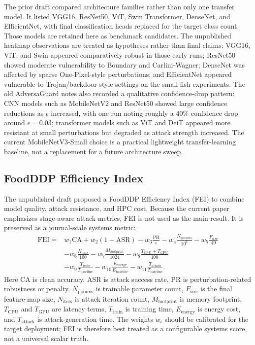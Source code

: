﻿\documentclass[6p,10pt,times]{ieeeaccess}
\begin{document}
The prior draft compared architecture families rather than only one transfer model. It listed VGG16, ResNet50, ViT, Swin Transformer, DenseNet, and EfficientNet, with final classification heads replaced for the target class count. Those models are retained here as benchmark candidates. The unpublished heatmap observations are treated as hypotheses rather than final claims: VGG16, ViT, and Swin appeared comparatively robust in those early runs; ResNet50 showed moderate vulnerability to Boundary and Carlini-Wagner; DenseNet was affected by sparse One-Pixel-style perturbations; and EfficientNet appeared vulnerable to Trojan/backdoor-style settings on the small fish experiments. The old AdversaGuard notes also recorded a qualitative confidence-drop pattern: CNN models such as MobileNetV2 and ResNet50 showed large confidence reductions as \(\epsilon\) increased, with one run noting roughly a 40\% confidence drop around \(\epsilon=0.03\); transformer models such as ViT and DeiT appeared more resistant at small perturbations but degraded as attack strength increased. The current MobileNetV3-Small choice is a practical lightweight transfer-learning baseline, not a replacement for a future architecture sweep.

\subsection{FoodDDP Efficiency Index}

The unpublished draft proposed a FoodDDP Efficiency Index (FEI) to combine model quality, attack resistance, and HPC cost. Because the current paper emphasizes stage-aware attack metrics, FEI is not used as the main result. It is preserved as a journal-scale systems metric:
\begin{equation}
\begin{aligned}
\mathrm{FEI}={}&
w_1\mathrm{CA}+w_2(1-\mathrm{ASR})
-w_3\frac{\mathrm{PR}}{\epsilon}
-w_4\frac{N_{\mathrm{params}}}{10^6}
-w_5\frac{F_{\mathrm{size}}}{49}\\
&-w_6\frac{N_{\mathrm{iters}}}{100}
-w_7\frac{M_{\mathrm{footprint}}}{1024}
-w_8\frac{T_{\mathrm{CPU}}+T_{\mathrm{GPU}}}{100}\\
&-w_9\frac{T_{\mathrm{train}}}{T_{\mathrm{baseline}}}
-w_{10}\frac{E_{\mathrm{energy}}}{E_{\mathrm{baseline}}}
-w_{11}\frac{T_{\mathrm{attack}}}{T_{\mathrm{baseline}}}.
\end{aligned}
\label{eq:fei}
\end{equation}
Here CA is clean accuracy, ASR is attack success rate, PR is perturbation-related robustness or penalty, \(N_{\mathrm{params}}\) is trainable parameter count, \(F_{\mathrm{size}}\) is the final feature-map size, \(N_{\mathrm{iters}}\) is attack iteration count, \(M_{\mathrm{footprint}}\) is memory footprint, \(T_{\mathrm{CPU}}\) and \(T_{\mathrm{GPU}}\) are latency terms, \(T_{\mathrm{train}}\) is training time, \(E_{\mathrm{energy}}\) is energy cost, and \(T_{\mathrm{attack}}\) is attack-generation time. The weights \(w_i\) should be calibrated for the target deployment; FEI is therefore best treated as a configurable systems score, not a universal scalar truth.
\end{document}
